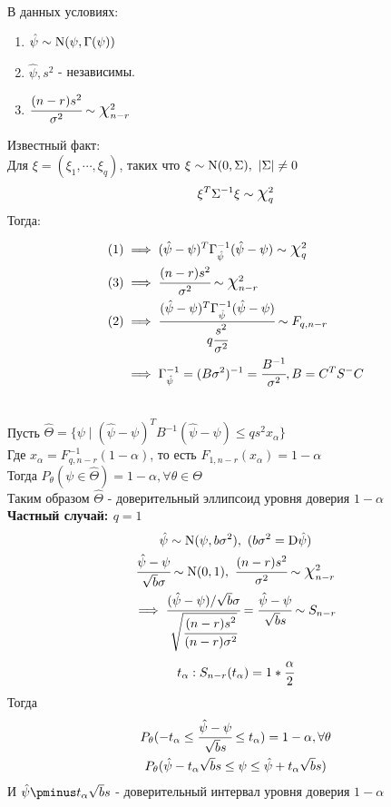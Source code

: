 \documentclass[main.tex]{subfiles}
\begin{document}
\begin{statement} ~\\
	В данных условиях:
	\begin{enumerate}
		\item $\hat\psi \sim \mathrm{N}(\psi, \Gamma(\psi))$
		\item $\hat\psi,s^2$ - независимы.
		\item $\cfrac{(n-r)s^2}{\sigma^2} \sim \mbox{\Large$\chi$}_{n-r}^2$
	\end{enumerate}
	Известный факт:\\
	Для $\xi = (\xi_1,\cdots,\xi_q)$, таких что $\xi \sim \mathrm{N}(0,\Sigma),\ |\Sigma| \neq 0$
	\[\xi^T\Sigma^{-1}\xi \sim \mbox{\Large$\chi$}_q^2\]
	Тогда:
	\begin{align*}
		(1) &\implies (\hat\psi-\psi)^T\Gamma^{-1}_{\hat\psi}(\hat\psi-\psi) \sim \mbox{\Large$\chi$}_q^2\\
		(3) &\implies \cfrac{(n-r)s^2}{\sigma^2} \sim \mbox{\Large$\chi$}_{n-r}^2\\
		(2) &\implies \cfrac{(\hat\psi-\psi)^T\Gamma^{-1}_{\hat\psi}(\hat\psi-\psi)}{q \cfrac{s^2}{\sigma^2}} \sim F_{q,n-r}\\
			&\implies \Gamma^{-1}_{\hat\psi} = (B\sigma^2)^{-1} = \cfrac{B^{-1}}{\sigma^2}, B = C^TS^-C
	\end{align*}
\end{statement}
\begin{definition} ~\\
Пусть $\hat\Theta = \{\psi \mid (\hat\psi - \psi)^TB^{-1}(\hat\psi - \psi) \leq qs^2x_\alpha\}$\\
Где $x_\alpha = F^{-1}_{q,n-r}(1-\alpha)$, то есть $F_{1,n-r}(x_\alpha)=1-\alpha$\\
Тогда $P_\theta(\psi \in \hat\Theta) = 1-\alpha, \forall \theta \in \Theta$\\
Таким образом $\hat\Theta$ - доверительный эллипсоид уровня доверия $1-\alpha$\\
\textbf{Частный случай: $q=1$}
\begin{gather*}
	\hat\psi \sim \sN(\psi,b\sigma^2),\ (b\sigma^2=\mathrm{D}\hat\psi)\\
	\cfrac{\hat\psi-\psi}{\sqrt{b}\sigma}\sim\sN(0,1),\ \cfrac{(n-r)s^2}{\sigma^2}\sim\bigchi_{n-r}^2\\
	\implies \cfrac{(\hat\psi-\psi)/\sqrt{b}\sigma}{\sqrt{\cfrac{(n-r)s^2}{(n-r)\sigma^2}}} = \cfrac{\hat\psi-\psi}{\sqrt{b}s} \sim S_{n-r}\\
	t_\alpha:S_{n-r}(t_\alpha) = 1 * \cfrac{\alpha}{2}
\end{gather*}
Тогда
\begin{gather*}
	P_\theta(-t_\alpha \leq \cfrac{\hat\psi-\psi}{\sqrt{b}s} \leq t_\alpha) = 1 - \alpha, \forall \theta\\
	P_\theta(\hat\psi - t_\alpha\sqrt{b}s \leq \psi \leq \hat\psi + t_\alpha\sqrt{b}s)\\
\end{gather*}
И $\hat\psi \pminus t_\alpha\sqrt{b}s$ - доверительный интервал уровня доверия $1 - \alpha$
\end{definition}
\end{document}
